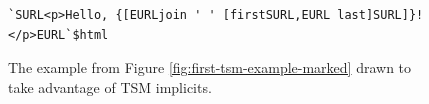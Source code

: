 \begin{figure}[h]
\begin{lstlisting}[numbers=none]
`SURL<p>Hello, {[EURLjoin ' ' [firstSURL,EURL last]SURL]}!</p>EURL`$html
\end{lstlisting}
\caption{The example from Figure \ref{fig:first-tsm-example-marked} drawn to take advantage of TSM implicits.}
\label{fig:first-tsm-example-implicit}
\end{figure}




